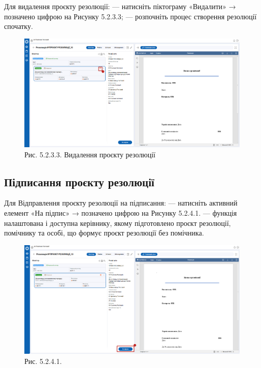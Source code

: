 Для видалення проєкту резолюції:
--- натисніть піктограму «Видалити» → позначено цифрою  на Рисунку 5.2.3.3;
--- розпочніть процес створення резолюції спочатку.

\begin{figure}[!htbp]
\centerline{\includegraphics[width=\textwidth]{img/5.2.3.3.png}}
\caption{Рис. 5.2.3.3. Видалення проєкту резолюції}
\end{figure}

\subsection{Підписання проєкту резолюції}

Для Відправлення проєкту резолюції на підписання:
--- натисніть активний елемент «На підпис» → позначено цифрою  на Рисунку 5.2.4.1.
--- функція налаштована і доступна керівнику, якому підготовлено проєкт резолюції,
помічнику та особі, що формує проєкт резолюції без помічника.

\begin{figure}[!htbp]
\centerline{\includegraphics[width=\textwidth]{img/5.2.4.1.png}}
\caption{Рис. 5.2.4.1. }
\end{figure}

